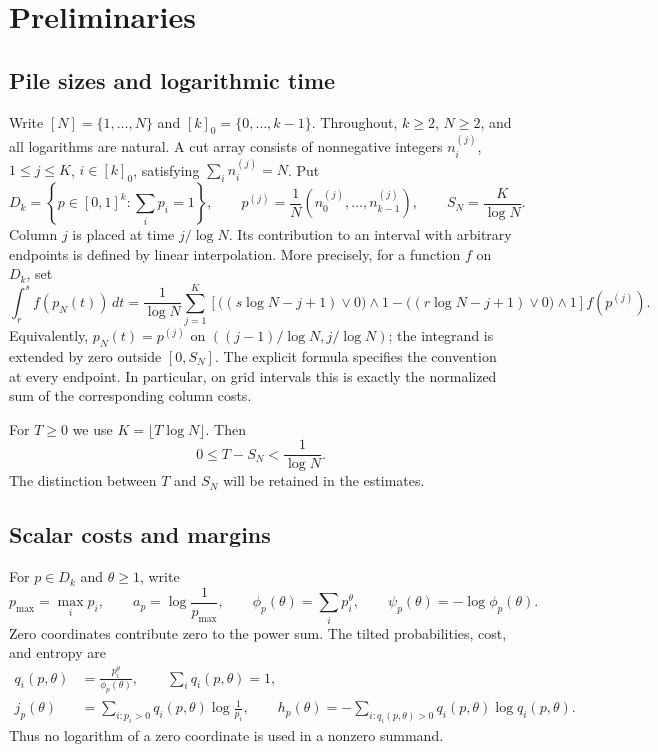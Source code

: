 \section{Preliminaries}
\label{sec:preliminaries}

\subsection{Pile sizes and logarithmic time}

Write $[N]=\{1,\ldots,N\}$ and $[k]_0=\{0,\ldots,k-1\}$. Throughout,
$k\ge2$, $N\ge2$, and all logarithms are natural. A cut array consists of
nonnegative integers $n_i^{(j)}$, $1\le j\le K$, $i\in[k]_0$, satisfying
$\sum_i n_i^{(j)}=N$. Put
\[
 D_k=\left\{p\in[0,1]^k:\sum_i p_i=1\right\},\qquad
 p^{(j)}=\frac1N(n_0^{(j)},\ldots,n_{k-1}^{(j)}),\qquad
 S_N=\frac K{\log N}.
\]
Column $j$ is placed at time $j/\log N$. Its contribution to an interval
with arbitrary endpoints is defined by linear interpolation. More
precisely, for a function $f$ on $D_k$, set
\begin{equation}\label{eq:empirical-integral}
 \int_r^s f(p_N(t))\,dt
 =\frac1{\log N}\sum_{j=1}^K
 \left[\bigl((s\log N-j+1)\vee0\bigr)\wedge1
       -\bigl((r\log N-j+1)\vee0\bigr)\wedge1\right]f(p^{(j)}).
\end{equation}
Equivalently, $p_N(t)=p^{(j)}$ on
$((j-1)/\log N,j/\log N)$; the integrand is extended by zero outside
$[0,S_N]$. The explicit formula specifies the convention at every
endpoint. In particular, on grid intervals this is exactly the normalized
sum of the corresponding column costs.

For $T\ge0$ we use $K=\lfloor T\log N\rfloor$. Then
\begin{equation}\label{eq:horizon-rounding}
 0\le T-S_N<\frac1{\log N}.
\end{equation}
The distinction between $T$ and $S_N$ will be retained in the estimates.

\subsection{Scalar costs and margins}
\label{subsec:scalar-costs}

For $p\in D_k$ and $\theta\ge1$, write
\[
 p_{\max}=\max_i p_i,\qquad a_p=\log\frac1{p_{\max}},\qquad
 \phi_p(\theta)=\sum_i p_i^\theta,\qquad
 \psi_p(\theta)=-\log\phi_p(\theta).
\]
Zero coordinates contribute zero to the power sum. The tilted
probabilities, cost, and entropy are
\begin{align}\label{eq:tilted-costs}
 q_i(p,\theta)&=\frac{p_i^\theta}{\phi_p(\theta)},\qquad
 \sum_i q_i(p,\theta)=1,\nonumber\\
 j_p(\theta)&=\sum_{i:p_i>0}q_i(p,\theta)\log\frac1{p_i},\qquad
 h_p(\theta)=-\sum_{i:q_i(p,\theta)>0}q_i(p,\theta)\log q_i(p,\theta).
\end{align}
Thus no logarithm of a zero coordinate is used in a nonzero summand.

